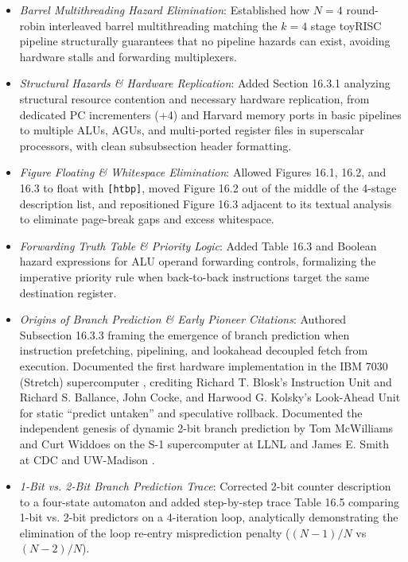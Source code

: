 \begin{itemize}
\begin{itemize}
        \item \textit{Barrel Multithreading Hazard Elimination}: Established how $N = 4$ round-robin interleaved barrel multithreading matching the $k = 4$ stage toyRISC pipeline structurally guarantees that no pipeline hazards can exist, avoiding hardware stalls and forwarding multiplexers.
        \item \textit{Structural Hazards \& Hardware Replication}: Added Section 16.3.1 analyzing structural resource contention and necessary hardware replication, from dedicated PC incrementers (+4) and Harvard memory ports in basic pipelines to multiple ALUs, AGUs, and multi-ported register files in superscalar processors, with clean subsubsection header formatting.
        \item \textit{Figure Floating \& Whitespace Elimination}: Allowed Figures 16.1, 16.2, and 16.3 to float with \texttt{[htbp]}, moved Figure 16.2 out of the middle of the 4-stage description list, and repositioned Figure 16.3 adjacent to its textual analysis to eliminate page-break gaps and excess whitespace.
        \item \textit{Forwarding Truth Table \& Priority Logic}: Added Table 16.3 and Boolean hazard expressions for ALU operand forwarding controls, formalizing the imperative priority rule when back-to-back instructions target the same destination register.
        \item \textit{Origins of Branch Prediction \& Early Pioneer Citations}: Authored Subsection 16.3.3 framing the emergence of branch prediction when instruction prefetching, pipelining, and lookahead decoupled fetch from execution. Documented the first hardware implementation in the IBM 7030 (Stretch) supercomputer \cite{buchholz1962}, crediting Richard T. Blosk's Instruction Unit \cite{blosk1960} and Richard S. Ballance, John Cocke, and Harwood G. Kolsky's Look-Ahead Unit \cite{ballance1962lookahead} for static ``predict untaken'' and speculative rollback. Documented the independent genesis of dynamic 2-bit branch prediction by Tom McWilliams and Curt Widdoes on the S-1 supercomputer at LLNL \cite{s1project1979} and James E. Smith at CDC and UW-Madison \cite{smith1983patent, smith1981study}.
        \item \textit{1-Bit vs. 2-Bit Branch Prediction Trace}: Corrected 2-bit counter description to a four-state automaton and added step-by-step trace Table 16.5 comparing 1-bit vs. 2-bit predictors on a 4-iteration loop, analytically demonstrating the elimination of the loop re-entry misprediction penalty ($(N-1)/N$ vs $(N-2)/N$).

\end{itemize}
\end{itemize}
